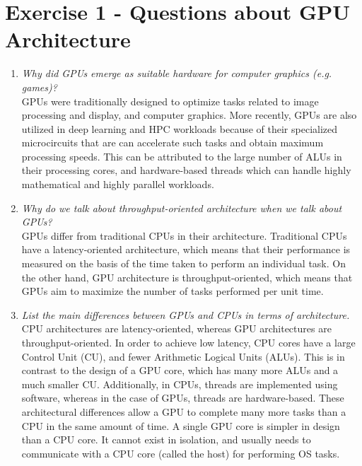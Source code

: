 \documentclass[12pt]{article}
\begin{document}
\section{Exercise 1 - Questions about GPU Architecture}
\begin{enumerate}
    \item \textit{Why did GPUs emerge as suitable hardware for computer graphics (e.g. games)?}\\
    GPUs were traditionally designed to optimize tasks related to image processing and display, and computer graphics. More recently, GPUs are also utilized in deep learning and HPC workloads because of their specialized microcircuits that are can accelerate such tasks and obtain maximum processing speeds. This can be attributed to the large number of ALUs in their processing cores, and hardware-based threads which can handle highly mathematical and highly parallel workloads.
    
    \item \textit{Why do we talk about throughput-oriented architecture when we talk about GPUs?}\\
    GPUs differ from traditional CPUs in their architecture. Traditional CPUs have a latency-oriented architecture, which means that their performance is measured on the basis of the time taken to perform an individual task. On the other hand, GPU architecture is throughput-oriented, which means that GPUs aim to maximize the number of tasks performed per unit time.
    
    \item \textit{List the main differences between GPUs and CPUs in terms of architecture.}\\
    CPU architectures are latency-oriented, whereas GPU architectures are throughput-oriented. In order to achieve low latency, CPU cores have a large Control Unit (CU), and fewer Arithmetic Logical Units (ALUs). This is in contrast to the design of a GPU core, which has many more ALUs and a much smaller CU. Additionally, in CPUs, threads are implemented using software, whereas in the case of GPUs, threads are hardware-based. These architectural differences allow a GPU to complete many more tasks than a CPU in the same amount of time. A single GPU core is simpler in design than a CPU core. It cannot exist in isolation, and usually needs to communicate with a CPU core (called the host) for performing OS tasks. 
    

\end{enumerate}
\end{document}
